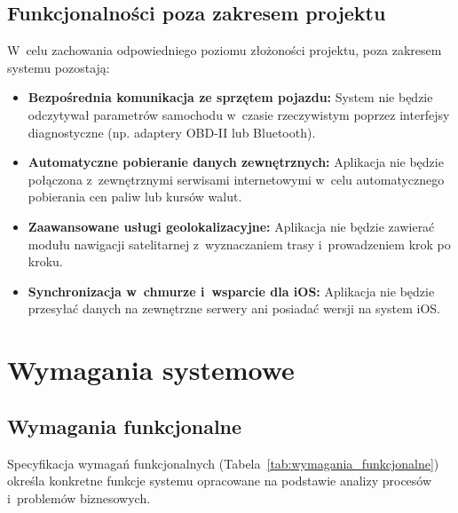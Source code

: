 \subsection{Funkcjonalności poza zakresem projektu}
\label{subsec:zakres_out}

W~celu zachowania odpowiedniego poziomu złożoności projektu, poza zakresem systemu pozostają:
\begin{itemize}
    \item \textbf{Bezpośrednia komunikacja ze sprzętem pojazdu:} System nie będzie odczytywał parametrów samochodu w~czasie rzeczywistym poprzez interfejsy diagnostyczne (np. adaptery OBD-II lub Bluetooth).
    \item \textbf{Automatyczne pobieranie danych zewnętrznych:} Aplikacja nie będzie połączona z~zewnętrznymi serwisami internetowymi w~celu automatycznego pobierania cen paliw lub kursów walut.
    \item \textbf{Zaawansowane usługi geolokalizacyjne:} Aplikacja nie będzie zawierać modułu nawigacji satelitarnej z~wyznaczaniem trasy i~prowadzeniem krok po kroku.
    \item \textbf{Synchronizacja w~chmurze i~wsparcie dla iOS:} Aplikacja nie będzie przesyłać danych na zewnętrzne serwery ani posiadać wersji na system iOS.
\end{itemize}

\section{Wymagania systemowe}
\label{sec:wymagania_systemowe}
\subsection{Wymagania funkcjonalne}
\label{subsec:wymagania_funkcjonalne}

Specyfikacja wymagań funkcjonalnych (Tabela~\ref{tab:wymagania_funkcjonalne}) określa konkretne funkcje systemu opracowane na podstawie analizy procesów i~problemów biznesowych.

